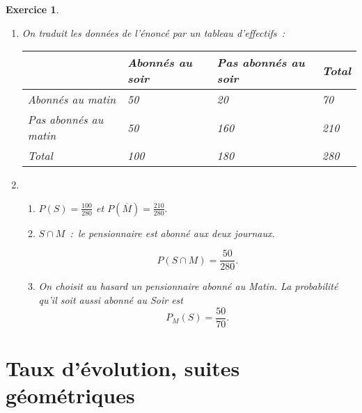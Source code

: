 \documentclass[10pt]{article}
\newtheorem{exo}{Exercice}
\begin{document}
\begin{exo}

\begin{enumerate}
\item On traduit les données de l'énoncé par un tableau d'effectifs~:

\begin{center}
 \begin{tabular}{|m{3.5cm}|m{3cm}|m{3cm}|m{3cm}|}\hline
&Abonnés au soir &Pas abonnés au soir& Total \\ \hline 
Abonnés au matin& 50& 20&70 \\ \hline
Pas abonnés au matin& 50&160 &210 \\ \hline
Total& 100& 180& 280\\ \hline
\end{tabular}
\end{center}
\item 

\begin{enumerate}
\item $P(S)=\frac{100}{280}$ et $ P\left(\overline{M}\right)=\frac{210}{280}.$
\item $S\cap M$~:~\og le pensionnaire est abonné aux deux journaux. \fg

\[P\left(S\cap M\right)=\frac{50}{280}.\]
\item On choisit au hasard un pensionnaire abonné au \textit{Matin}. La probabilité qu'il soit aussi abonné au \textit{Soir} est \[P_M(S)=\frac{50}{70}.\]
\end{enumerate}
\end{enumerate}
\end{exo}


\section{Taux d'évolution, suites géométriques}
\end{document}
